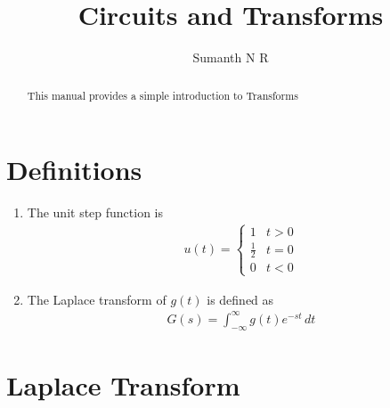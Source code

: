 \documentclass[journal,12pt,twocolumn]{IEEEtran}
\renewcommand\thesection{\arabic{section}}
\begin{document}
\vspace{3cm}

\title{ Circuits and Transforms }
\author{ Sumanth N R }
\maketitle
\tableofcontents

\renewcommand{\thefigure}{\theenumi}
\renewcommand{\thetable}{\theenumi}

\bigskip

\begin{abstract}
This manual provides a simple introduction to Transforms
\end{abstract}


\section{Definitions}

\begin{enumerate}[label=\arabic*.,ref=\thesection.\theenumi]

\item The unit step function is 
	\begin{align} u(t) = \begin{cases}
		1 & t > 0 \\
		\frac{1}{2} & t = 0 \\
		0 & t < 0
	\end{cases} \end{align}

\item The Laplace transform of $g(t)$ is defined as 
	\begin{align}
		G(s) = \int_{-\infty}^{\infty} g(t) e^{-st}\, dt
	\end{align}

\end{enumerate}



\section{Laplace Transform}
\end{document}
